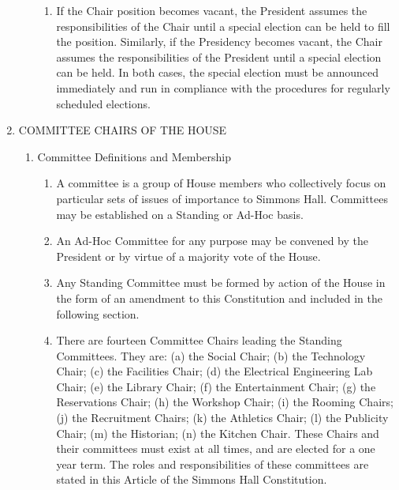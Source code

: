 \documentclass[letterpaper]{article}
\begin{document}
\begin{enumerate}
\begin{enumerate}
\begin{enumerate}
\item If the Chair position becomes vacant, the President assumes the responsibilities of the Chair until a special election can be held to fill the position. Similarly, if the Presidency becomes vacant, the Chair assumes the responsibilities of the President until a special election can be held. In both cases, the special election must be announced immediately and run in compliance with the procedures for regularly scheduled elections.

\end{enumerate}

\end{enumerate}

\item COMMITTEE CHAIRS OF THE HOUSE

\begin{enumerate}

\item Committee Definitions and Membership

\begin{enumerate}

\item A committee is a group of House members who collectively focus on particular sets of issues of importance to Simmons Hall. Committees may be established on a Standing or Ad-Hoc basis.

\item An Ad-Hoc Committee for any purpose may be convened by the President or by virtue of a majority vote of the House.

\item Any Standing Committee must be formed by action of the House in the form of an amendment to this Constitution and included in the following section.

\item There are fourteen Committee Chairs leading the Standing Committees. They are: (a) the Social Chair; (b) the Technology Chair; (c) the Facilities Chair; (d) the Electrical Engineering Lab Chair; (e) the Library Chair; (f) the Entertainment Chair; (g) the Reservations Chair; (h) the Workshop Chair; (i) the Rooming Chairs; (j) the Recruitment Chairs; (k) the Athletics Chair; (l) the Publicity Chair; (m) the Historian; (n) the Kitchen Chair. These Chairs and their committees must exist at all times, and are elected for a one year term. The roles and responsibilities of these committees are stated in this Article of the Simmons Hall Constitution.


\end{enumerate}
\end{enumerate}
\end{enumerate}
\end{document}
